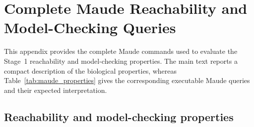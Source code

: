 \section{Complete Maude Reachability and Model-Checking Queries}
\label{app:maude_queries}

This appendix provides the complete Maude commands used to evaluate the
Stage~1 reachability and model-checking properties. The main text reports a
compact description of the biological properties, whereas
Table~\ref{tab:maude_properties} gives the corresponding executable Maude
queries and their expected interpretation.

\subsection{Reachability and model-checking properties}
\label{subsec:maude_properties}

\begingroup
\scriptsize
\setlength{\tabcolsep}{3pt}
\renewcommand{\arraystretch}{1.15}

